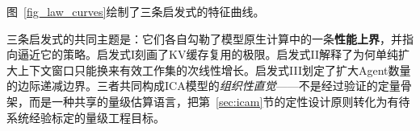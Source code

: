 图~\ref{fig_law_curves}绘制了三条启发式的特征曲线。


三条启发式的共同主题是：它们各自勾勒了模型原生计算中的一条\textbf{性能上界}，并指向逼近它的策略。启发式I刻画了KV缓存复用的极限。启发式II解释了为何单纯扩大上下文窗口只能换来有效工作集的次线性增长。启发式III划定了扩大Agent数量的边际递减边界。三者共同构成ICA模型的\emph{组织性直觉}——不是经过验证的定量骨架，而是一种共享的量级估算语言，把第~\ref{sec:icam}节的定性设计原则转化为有待系统经验标定的量级工程目标。
